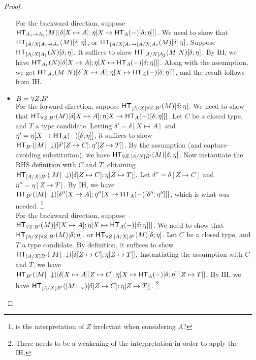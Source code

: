 \documentclass{article}
\begin{document}
\begin{proof}
\begin{itemize}
For the backward direction, suppose
$\mathsf{HT}_{A_1 \to A_2}(M)[\delta[X \mapsto A];\eta[X \mapsto \mathsf{HT}_{A}(-)[\delta;\eta]]]$.
We need to show that $\mathsf{HT}_{[A/X]A_1 \to A_2}(M)[\delta;\eta]$,
or $\mathsf{HT}_{[A/X]A_1 \to [A/X]A_2}(M)[\delta;\eta]$. Suppose $\mathsf{HT}_{[A/X]A_1}(N)[\delta;\eta]$.
It suffices to show $\mathsf{HT}_{[A/X]A_2}(M\ N)[\delta;\eta]$. By IH, we have
$\mathsf{HT}_{A_1}(N)[\delta[X \mapsto A];\eta[X \mapsto \mathsf{HT}_{A}(-)[\delta;\eta]]]$.
Along with the assumption, we get $\mathsf{HT}_{A_2}(M\ N)[\delta[X \mapsto A];\eta[X \mapsto \mathsf{HT}_{A}(-)[\delta;\eta]]]$, and the result follows from IH.

\item $B = \forall Z. B'$\\
For the forward direction, suppose $\mathsf{HT}_{[A/X]\forall Z. B'}(M)[\delta;\eta]$. We need to show that
$\mathsf{HT}_{\forall Z. B'}(M)[\delta[X \mapsto A];\eta[X \mapsto \mathsf{HT}_{A}(-)[\delta;\eta]]]$. Let $C$ be a closed type,
and $T$ a type candidate. Letting $\delta' = \delta[X \mapsto A]$ and
$\eta' = \eta[X \mapsto \mathsf{HT}_{A}(-)[\delta;\eta]]$, it suffices to show
$\mathsf{HT}_{B'}(|M|\ \downarrow)[\delta'[Z \mapsto C];\eta'[Z \mapsto T]]$. By the assumption (and
capture-avoiding substitution), we have $\mathsf{HT}_{\forall Z. [A/X]B'}(M)[\delta;\eta]$.
Now instantiate the RHS definition with $C$ and $T$, obtaining
$\mathsf{HT}_{[A/X]B'}(|M|\ \downarrow)[\delta[Z \mapsto C];\eta[Z \mapsto T]]$.
Let $\delta'' = \delta[Z \mapsto C]$ and $\eta'' = \eta[Z \mapsto T]$. By IH, we have
$\mathsf{HT}_{B'}(|M|\ \downarrow)[\delta''[X \mapsto A];\eta''[X \mapsto \mathsf{HT}_{A}(-)[\delta'';\eta'']]]$,
which is what was needed. \footnote{ is the interpretation of $Z$ irrelevant when considering $A$?}\\

For the backward direction, suppose
$\mathsf{HT}_{\forall Z. B'}(M)[\delta[X \mapsto A];\eta[X \mapsto \mathsf{HT}_{A}(-)[\delta;\eta]]]$.
We need to show that $\mathsf{HT}_{[A/X]\forall Z. B'}(M)[\delta;\eta]$, or $\mathsf{HT}_{\forall Z. [A/X]B'}(M)[\delta;\eta]$.
Let $C$ be a closed type, and $T$ a type candidate. By definition, it suffices
to show $\mathsf{HT}_{[A/X]B'}(|M|\ \downarrow)[\delta[Z \mapsto C];\eta[Z \mapsto T]]$.
Instantiating the assumption with $C$ and $T$, we have $\mathsf{HT}_{B'}(|M|\ \downarrow)[\delta[X \mapsto A][Z \mapsto C];\eta[X \mapsto \mathsf{HT}_{A}(-)[\delta;\eta]][Z \mapsto T]]$.
By IH, we have $\mathsf{HT}_{[A/X]B'}(|M|\ \downarrow)[\delta[Z \mapsto C];\eta[Z \mapsto T]]$. \footnote{There needs to be a weakening of the interpretation in order to apply the IH.}
\end{itemize}
\end{proof}
\end{document}
